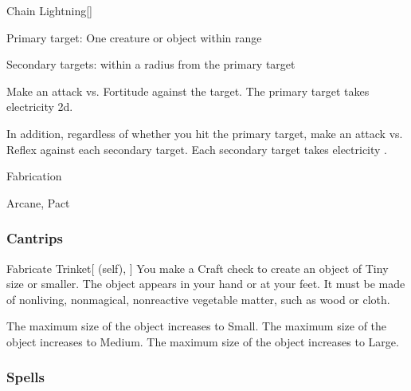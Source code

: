 \lowercase{\hypertarget{spell:Chain Lightning}{}}\label{spell:Chain Lightning}
\begin{freeability}[Rank 5]{\hypertarget{spell:Chain Lightning}{Chain Lightning}}[]

Primary target: One creature or object within \rngmed range
\par\noindent
Secondary targets:  within a \areasmall radius from the primary target

Make an attack vs. Fortitude against the target.
\hit The primary target takes electricity  \plus2d.

In addition, regardless of whether you hit the primary target, make an attack vs. Reflex against each secondary target.
\hit Each secondary target takes electricity .
\end{freeability}
\vspace{0.25em}


\newpage
\begin{spellsection}{Fabrication}

\begin{spellheader}
\end{spellheader}


 Arcane, Pact

\subsubsection{Cantrips}


\begin{attuneability}{Fabricate Trinket}[ (self), ]
You make a Craft check to create an object of Tiny size or smaller.
The object appears in your hand or at your feet.
It must be made of nonliving, nonmagical, nonreactive vegetable matter, such as wood or cloth.

\rankline
{} The maximum size of the object increases to Small.
 The maximum size of the object increases to Medium.
 The maximum size of the object increases to Large.
\end{attuneability}

\end{spellsection}


\subsubsection{Spells}


